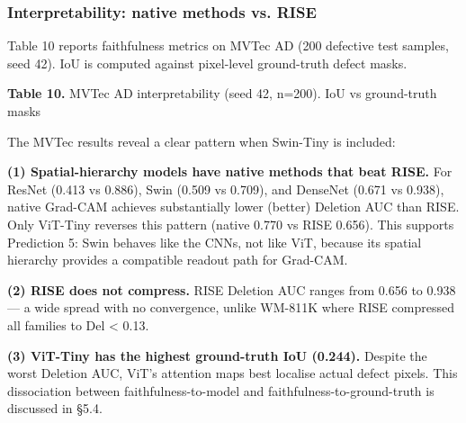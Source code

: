 \documentclass[11pt,a4paper]{article}
\begin{document}
\subsubsection{Interpretability: native methods vs. RISE}

Table 10 reports faithfulness metrics on MVTec AD (200 defective test samples, seed 42). IoU is computed against pixel-level ground-truth defect masks.

\begin{center}
\small \textbf{Table 10.} MVTec AD interpretability (seed 42, n=200). IoU vs ground-truth masks
\end{center}

\noindent{}


The MVTec results reveal a clear pattern when Swin-Tiny is included:

\textbf{(1) Spatial-hierarchy models have native methods that beat RISE.} For ResNet (0.413 vs 0.886), Swin (0.509 vs 0.709), and DenseNet (0.671 vs 0.938), native Grad-CAM achieves substantially lower (better) Deletion AUC than RISE. Only ViT-Tiny reverses this pattern (native 0.770 vs RISE 0.656). This supports Prediction 5: Swin behaves like the CNNs, not like ViT, because its spatial hierarchy provides a compatible readout path for Grad-CAM.

\textbf{(2) RISE does not compress.} RISE Deletion AUC ranges from 0.656 to 0.938 --- a wide spread with no convergence, unlike WM-811K where RISE compressed all families to Del < 0.13.

\textbf{(3) ViT-Tiny has the highest ground-truth IoU (0.244).} Despite the worst Deletion AUC, ViT's attention maps best localise actual defect pixels. This dissociation between faithfulness-to-model and faithfulness-to-ground-truth is discussed in \S{}5.4.
\end{document}
